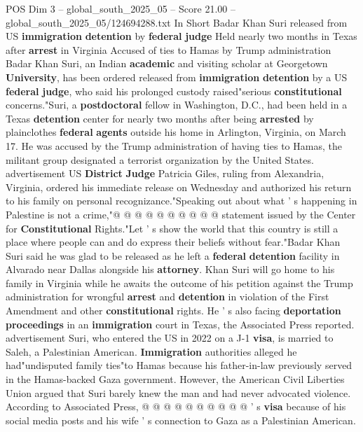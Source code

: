 \begin{textsample}{POS Dim 3 – global\_south\_2025\_05 – Score 21.00 – global\_south\_2025\_05/124694288.txt}  \label{ex:f3_pos_231}
In Short Badar Khan Suri released from US \textbf{immigration} \textbf{detention} by \textbf{federal} \textbf{judge} Held nearly two months in Texas after \textbf{arrest} in Virginia Accused of ties to Hamas by Trump administration Badar Khan Suri, an Indian \textbf{academic} and visiting scholar at Georgetown \textbf{University}, has been ordered released from \textbf{immigration} \textbf{detention} by a US \textbf{federal} \textbf{judge}, who said his prolonged custody raised"serious \textbf{constitutional} concerns."Suri, a \textbf{postdoctoral} fellow in Washington, D.C., had been held in a Texas \textbf{detention} center for nearly two months after being \textbf{arrested} by plainclothes \textbf{federal} \textbf{agents} outside his home in Arlington, Virginia, on March 17.
He was accused by the Trump administration of having ties to Hamas, the militant group designated a terrorist organization by the United States. advertisement US \textbf{District} \textbf{Judge} Patricia Giles, ruling from Alexandria, Virginia, ordered his immediate release on Wednesday and authorized his return to his family on personal recognizance."Speaking out about what ' s happening in Palestine is not a crime,"@ @ @ @ @ @ @ @ @ @ statement issued by the Center for \textbf{Constitutional} Rights."Let ' s show the world that this country is still a place where people can and do express their beliefs without fear."Badar Khan Suri said he was glad to be released as he left a \textbf{federal} \textbf{detention} facility in Alvarado near Dallas alongside his \textbf{attorney}.
Khan Suri will go home to his family in Virginia while he awaits the outcome of his petition against the Trump administration for wrongful \textbf{arrest} and \textbf{detention} in violation of the First Amendment and other \textbf{constitutional} rights.
He ' s also facing \textbf{deportation} \textbf{proceedings} in an \textbf{immigration} court in Texas, the Associated Press reported. advertisement Suri, who entered the US in 2022 on a J-1 \textbf{visa}, is married to Saleh, a Palestinian American. \textbf{Immigration} authorities alleged he had"undisputed family ties"to Hamas because his father-in-law previously served in the Hamas-backed Gaza government.
However, the American Civil Liberties Union argued that Suri barely knew the man and had never advocated violence.
According to Associated Press, @ @ @ @ @ @ @ @ @ @ ' s \textbf{visa} because of his social media posts and his wife ' s connection to Gaza as a Palestinian American.

\end{textsample}
